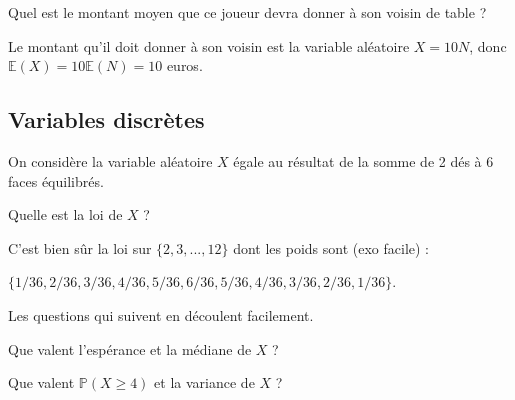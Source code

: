 \begin{question}
Quel est le montant moyen que ce joueur devra donner à son voisin de table ?
\begin{answers}
\end{answers}
\begin{explanations} Le montant qu'il doit donner à son voisin est la variable aléatoire $X=10N$, donc $\mathbb{E}(X)=10\mathbb{E}(N) = 10$ euros.
\end{explanations}
\end{question}


\subsection{Variables discrètes}

On considère la variable aléatoire $X$ égale au résultat de la somme de 2 dés à 6 faces équilibrés. 

\begin{question}
Quelle est la loi de $X$ ?
\begin{answers}
\end{answers}
\begin{explanations}
C'est bien sûr la loi sur $\{2,3,...,12\}$ dont les poids sont (exo facile) :

 $\{1/36,2/36,3/36,4/36,5/36,6/36,5/36,4/36,3/36,2/36,1/36\}$. 
 
Les questions qui suivent en découlent facilement.
\end{explanations}
\end{question}


\begin{question}
Que valent l'espérance et la médiane de $X$ ?
\begin{answers}
\end{answers}
\end{question}


\begin{question}
Que valent $\mathbb{P}(X\geq 4)$ et la variance de $X$ ?
\begin{answers}

\end{answers}
\end{question}


